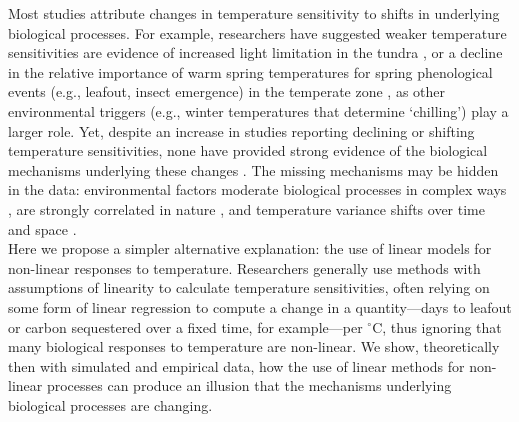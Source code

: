 \documentclass[11pt,letter]{article}
\begin{document}
Most studies attribute changes in temperature sensitivity to shifts in underlying biological processes. For example, researchers have suggested weaker temperature sensitivities are evidence of increased light limitation in the tundra \citep{piao2017}, or a decline in the relative importance of warm spring temperatures for spring phenological events (e.g., leafout, insect emergence) in the temperate zone \citep{fu2015, meng2020}, as other environmental triggers (e.g., winter temperatures that determine `chilling') play a larger role. Yet, despite an increase in studies reporting declining or shifting temperature sensitivities, none have provided strong evidence of the biological mechanisms underlying these changes  \citep[e.g.,][]{fu2015,meng2020}. The missing mechanisms may be hidden in the data: environmental factors moderate biological processes in complex ways \citep{chuine2016,gusewell2017}, are strongly correlated in nature \citep[e.g.,][]{fu2015}, and temperature variance shifts over time and space \citep{keenan2019}. \\

Here we propose a simpler alternative explanation: the use of linear models for non-linear responses to temperature. Researchers generally use methods with assumptions of linearity to calculate temperature sensitivities, often relying on some form of linear regression to compute a change in a quantity---days to leafout or carbon sequestered over a fixed time, for example---per $^{\circ}$C, thus ignoring that many biological responses to temperature are non-linear. We show, theoretically then with simulated and empirical data, how the use of linear methods for non-linear processes can produce an illusion that the mechanisms underlying biological processes are changing.\\ %
\end{document}

